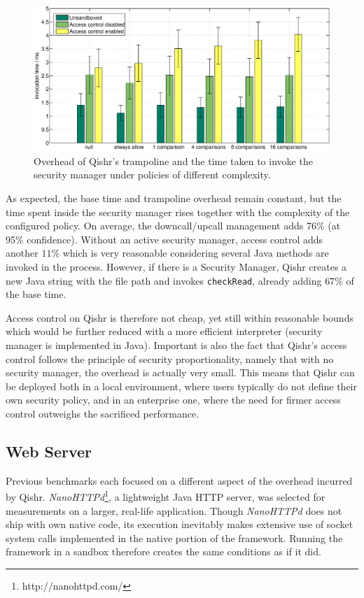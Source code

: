 \documentclass[a4paper,12pt,twoside,openright]{report}
\begin{document}
\begin{figure}
	\centering
	\includegraphics[width=1.1\textwidth]{graph_access.eps}
	\caption{Overhead of Qishr's trampoline and the time taken to invoke the security manager under policies of different complexity.}
	\label{fig:OverheadAccess}
\end{figure}

As expected, the base time and trampoline overhead remain constant, but the time spent inside the security manager rises together with the complexity of the configured policy. On average, the downcall/upcall management adds $76\%$ (at 95\% confidence). Without an active security manager, access control adds another $11\%$ which is very reasonable considering several Java methods are invoked in the process. However, if there is a Security Manager, Qishr creates a new Java string with the file path and invokes \texttt{checkRead}, already adding $67\%$ of the base time. 

Access control on Qishr is therefore not cheap, yet still within reasonable bounds which would be further reduced with a more efficient interpreter (security manager is implemented in Java). Important is also the fact that Qishr's access control follows the principle of security proportionality, namely that with no security manager, the overhead is actually very small. This means that Qishr can be deployed both in a local environment, where users typically do not define their own security policy, and in an enterprise one, where the need for firmer access control outweighs the sacrificed performance. 

\subsection{Web Server}

Previous benchmarks each focused on a different aspect of the overhead incurred by Qishr. \emph{NanoHTTPd}\footnote{http://nanohttpd.com/}, a lightweight Java HTTP server, was selected for measurements on a larger, real-life application. Though \emph{NanoHTTPd} does not ship with own native code, its execution inevitably makes extensive use of socket system calls implemented in the native portion of the framework. Running the framework in a sandbox therefore creates the same conditions as if it did.
\end{document}
